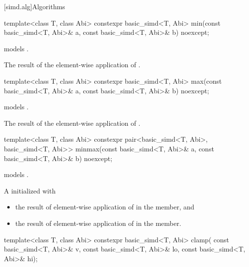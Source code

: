 [simd.alg]{Algorithms}

\begin{itemdecl}
template<class T, class Abi>
  constexpr basic_simd<T, Abi> min(const basic_simd<T, Abi>& a, const basic_simd<T, Abi>& b) noexcept;
\end{itemdecl}

\begin{itemdescr}
  \pnum\constraints
   models .

  \pnum\returns
  The result of the element-wise application of  \foralli.
\end{itemdescr}

\begin{itemdecl}
template<class T, class Abi>
  constexpr basic_simd<T, Abi> max(const basic_simd<T, Abi>& a, const basic_simd<T, Abi>& b) noexcept;
\end{itemdecl}

\begin{itemdescr}
  \pnum\constraints
   models .

  \pnum\returns
  The result of the element-wise application of  \foralli.
\end{itemdescr}

\begin{itemdecl}
template<class T, class Abi>
  constexpr pair<basic_simd<T, Abi>, basic_simd<T, Abi>>
  minmax(const basic_simd<T, Abi>& a, const basic_simd<T, Abi>& b) noexcept;
\end{itemdecl}

\begin{itemdescr}
  \pnum\constraints
   models .

  \pnum\returns
  A  initialized with
  \begin{itemize}
    \item the result of element-wise application of  \foralli{} in
      the  member, and
    \item the result of element-wise application of  \foralli{} in
      the  member.
  \end{itemize}
\end{itemdescr}

\begin{itemdecl}
template<class T, class Abi>
  constexpr basic_simd<T, Abi> clamp(
    const basic_simd<T, Abi>& v, const basic_simd<T, Abi>& lo, const basic_simd<T, Abi>& hi);
\end{itemdecl}

